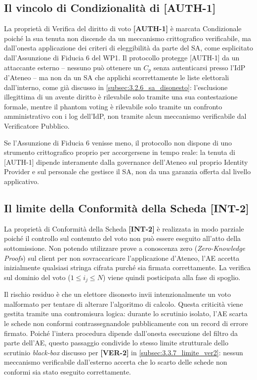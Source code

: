 \subsection{Il vincolo di Condizionalità di [AUTH-1]}
\label{subsec:3.3.1_vincolo_auth1}

La proprietà di Verifica del diritto di voto \textbf{[AUTH-1]} è marcata Condizionale poiché la sua tenuta non discende da un meccanismo crittografico verificabile, ma dall'onesta applicazione dei criteri di eleggibilità da parte del SA, come esplicitato dall'Assunzione di Fiducia 6 del WP1. Il protocollo protegge [AUTH-1] da un attaccante esterno -- nessuno può ottenere un $C_p$ senza autenticarsi presso l'IdP d'Ateneo -- ma non da un SA che applichi scorrettamente le liste elettorali dall'interno, come già discusso in \ref{subsec:3.2.6_sa_disonesto}: l'esclusione illegittima di un avente diritto è rilevabile solo tramite una sua contestazione formale, mentre il phantom voting è rilevabile solo tramite un confronto amministrativo con i log dell'IdP, non tramite alcun meccanismo verificabile dal Verificatore Pubblico.

Se l'Assunzione di Fiducia 6 venisse meno, il protocollo non dispone di uno strumento crittografico proprio per accorgersene in tempo reale: la tenuta di [AUTH-1] dipende interamente dalla governance dell'Ateneo sul proprio Identity Provider e sul personale che gestisce il SA, non da una garanzia offerta dal livello applicativo.

\subsection{Il limite della Conformità della Scheda [INT-2]}
\label{subsec:3.3.2_limite_int2}

La proprietà di Conformità della Scheda \textbf{[INT-2]} è realizzata in modo parziale poiché il controllo sul contenuto del voto non può essere eseguito all'atto della sottomissione. Non potendo utilizzare prove a conoscenza zero (\textit{Zero-Knowledge Proofs}) sul client per non sovraccaricare l'applicazione d'Ateneo, l'AE accetta inizialmente qualsiasi stringa cifrata purché sia firmata correttamente. La verifica sul dominio del voto ($1 \le i_j \le N$) viene quindi posticipata alla fase di spoglio.

Il rischio residuo è che un elettore disonesto invii intenzionalmente un voto malformato per tentare di alterare l'algoritmo di calcolo. Questa criticità viene gestita tramite una contromisura logica: durante lo scrutinio isolato, l'AE scarta le schede non conformi contrassegnandole pubblicamente con un record di errore firmato. Poiché l'intera procedura dipende dall'onesta esecuzione del filtro da parte dell'AE, questo passaggio condivide lo stesso limite strutturale dello scrutinio \textit{black-box} discusso per \textbf{[VER-2]} in \ref{subsec:3.3.7_limite_ver2}: nessun meccanismo verificabile dall'esterno accerta che lo scarto delle schede non conformi sia stato eseguito correttamente.

